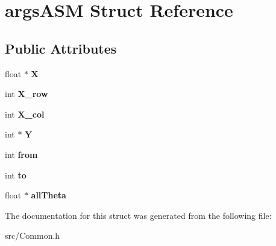 \hypertarget{structargs_a_s_m}{\section{args\-A\-S\-M Struct Reference}
\label{structargs_a_s_m}
}
\subsection*{Public Attributes}
\begin{DoxyCompactItemize}
\item 
\hypertarget{structargs_a_s_m_a429916dcce2c029eacc26ce554b64be1}{float $\ast$ {\bfseries X}}\label{structargs_a_s_m_a429916dcce2c029eacc26ce554b64be1}

\item 
\hypertarget{structargs_a_s_m_adbff7f49646817bb1a5536e441074d64}{int {\bfseries X\-\_\-row}}\label{structargs_a_s_m_adbff7f49646817bb1a5536e441074d64}

\item 
\hypertarget{structargs_a_s_m_a6a1cc2d43b8e2f4339c0857f52ff0f31}{int {\bfseries X\-\_\-col}}\label{structargs_a_s_m_a6a1cc2d43b8e2f4339c0857f52ff0f31}

\item 
\hypertarget{structargs_a_s_m_af3cb288b0f5727e2abe3a1b942cb0578}{int $\ast$ {\bfseries Y}}\label{structargs_a_s_m_af3cb288b0f5727e2abe3a1b942cb0578}

\item 
\hypertarget{structargs_a_s_m_a368526cbead6016daf17febb0433861d}{int {\bfseries from}}\label{structargs_a_s_m_a368526cbead6016daf17febb0433861d}

\item 
\hypertarget{structargs_a_s_m_afa4f5876c50c4c361439d372c1cb25db}{int {\bfseries to}}\label{structargs_a_s_m_afa4f5876c50c4c361439d372c1cb25db}

\item 
\hypertarget{structargs_a_s_m_a19e1c2e1f46eaef633003650f9548e33}{float $\ast$ {\bfseries all\-Theta}}\label{structargs_a_s_m_a19e1c2e1f46eaef633003650f9548e33}

\end{DoxyCompactItemize}


The documentation for this struct was generated from the following file\-:\begin{DoxyCompactItemize}
\item 
src/Common.\-h\end{DoxyCompactItemize}
